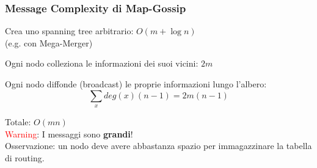 \documentclass[10pt,xcolor=dvipsnames]{beamer}
\begin{document}
\begin{frame}
	\frametitle{Message Complexity di Map-Gossip}
	
	\pause
	 Crea uno spanning tree arbitrario: $O(m+\log n)$\\
	   (e.g. con Mega-Merger)
	\vfill

	\pause
	 Ogni nodo colleziona le informazioni dei suoi vicini: $2m$
	\vfill

	\pause
	 Ogni nodo diffonde (broadcast) le proprie informazioni lungo l'albero:
	   $$ \sum_x deg(x)(n-1)=2m(n-1)$$
	\vfill

	\pause
	Totale: $O(mn)$
	\pause
	\\
	\textcolor{red}{Warning}: I messaggi sono \textbf{grandi}!
	\\Osservazione: un nodo deve avere abbastanza spazio per immagazzinare la tabella di routing.
		
\end{frame}
\end{document}
